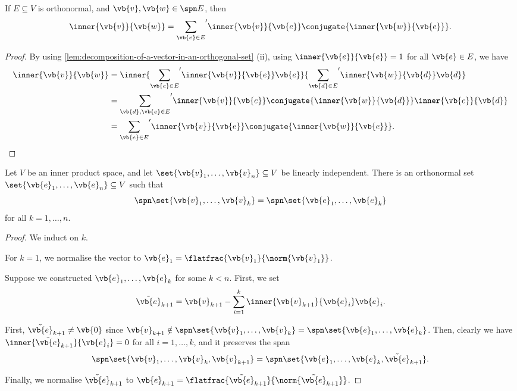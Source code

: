\begin{corollary}
    If \(E \subseteq V\) is orthonormal, and \(\vb{v}, \vb{w} \in \spn E\), then
    \[
        \inner{\vb{v}}{\vb{w}} = {\sum_{\vb{e} \in E}}' \inner{\vb{v}}{\vb{e}} \conjugate{\inner{\vb{w}}{\vb{e}}}.
    \]
\end{corollary}

\begin{proof}
    By using \autoref{lem:decomposition-of-a-vector-in-an-orthogonal-set} (ii), using \(\inner{\vb{e}}{\vb{e}} = 1\) for all \(\vb{e} \in E\), we have
    \begin{align*}
        \inner{\vb{v}}{\vb{w}} &= \inner{{\sum_{\vb{e} \in E}}' \inner{\vb{v}}{\vb{e}} \vb{e}}{{\sum_{\vb{d} \in E}}' \inner{\vb{w}}{\vb{d}} \vb{d}} \\
        &= {\sum_{\vb{d}, \vb{e} \in E}}' \inner{\vb{v}}{\vb{e}} \conjugate{\inner{\vb{w}}{\vb{d}}} \inner{\vb{e}}{\vb{d}} \\
        &= {\sum_{\vb{e} \in E}}' \inner{\vb{v}}{\vb{e}} \conjugate{\inner{\vb{w}}{\vb{e}}}.
    \end{align*}
\end{proof}

\begin{theorem}
    Let \(V\) be an inner product space, and let \(\set{\vb{v}_1, \ldots, \vb{v}_n} \subseteq V\) be linearly independent. There is an orthonormal set \(\set{\vb{e}_1, \ldots, \vb{e}_n} \subseteq V\) such that
    \[
        \spn\set{\vb{v}_1, \ldots, \vb{v}_k} = \spn\set{\vb{e}_1, \ldots, \vb{e}_k}
    \]
    for all \(k = 1, \ldots, n\).
\end{theorem}

\begin{proof}
    We induct on \(k\).

    For \(k = 1\), we normalise the vector to \(\vb{e}_1 = \flatfrac{\vb{v}_1}{\norm{\vb{v}_1}}\).

    Suppose we constructed \(\vb{e}_1, \ldots, \vb{e}_k\) for some \(k < n\). First, we set
    \[
        \tilde{\vb{e}}_{k + 1} = \vb{v}_{k + 1} - \sum_{i = 1}^{k} \inner{\vb{v}_{k + 1}}{\vb{e}_i} \vb{e}_i.
    \]

    First, \(\tilde{\vb{e}}_{k + 1} \neq \vb{0}\) since \(\vb{v}_{k + 1} \notin \spn \set{\vb{v}_1, \ldots, \vb{v}_k} = \spn \set{\vb{e}_1, \ldots, \vb{e}_k}\). Then, clearly we have \(\inner{\tilde{\vb{e}}_{k + 1}}{\vb{e}_i} = 0\) for all \(i = 1, \ldots, k\), and it preserves the span
    \[
        \spn \set{\vb{v}_1, \ldots, \vb{v}_k, \vb{v}_{k + 1}} = \spn \set{\vb{e}_1, \ldots, \vb{e}_k, \tilde{\vb{e}}_{k + 1}}.
    \]

    Finally, we normalise \(\tilde{\vb{e}}_{k + 1}\) to \(\vb{e}_{k + 1} = \flatfrac{\tilde{\vb{e}}_{k + 1}}{\norm{\tilde{\vb{e}}_{k + 1}}}\).
\end{proof}

